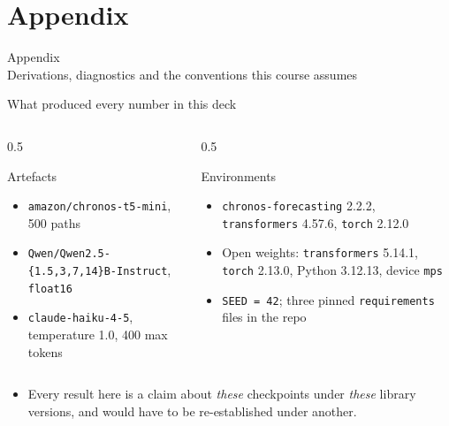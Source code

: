 \documentclass[9pt, aspectratio=169, t]{beamer}
\newcommand{\points}[1]{%
  \par\vspace{0.25em}%
  \begin{block}{}
    \vspace{-0.45em}
    {\small
     \setlength{\itemsep}{1pt}
     \begin{itemize}#1\end{itemize}}
    \vspace{-0.35em}
  \end{block}}
\begin{document}
\section{Appendix}
\begin{frame}[plain]
  \centering\vfill
  {\Large\textcolor{IDAred}{Appendix}}\\[0.4em]
  {\large Derivations, diagnostics and the conventions this course assumes}
  \vfill
\end{frame}

\begin{frame}{What produced every number in this deck}
  \begin{columns}[T]
    \begin{column}{0.5\textwidth}
      \begin{block}{Artefacts}
        \begin{itemize}
          \item \texttt{amazon/chronos-t5-mini}, 500 paths
          \item \texttt{Qwen/Qwen2.5-\{1.5,3,7,14\}B-Instruct}, \texttt{float16}
          \item \texttt{claude-haiku-4-5}, temperature 1.0, 400 max tokens
        \end{itemize}
      \end{block}
    \end{column}
    \begin{column}{0.5\textwidth}
      \begin{block}{Environments}
        \begin{itemize}
          \item \texttt{chronos-forecasting} 2.2.2, \texttt{transformers} 4.57.6,
                \texttt{torch} 2.12.0
          \item Open weights: \texttt{transformers} 5.14.1, \texttt{torch} 2.13.0,
                Python 3.12.13, device \texttt{mps}
          \item \texttt{SEED = 42}; three pinned \texttt{requirements} files in the repo
        \end{itemize}
      \end{block}
    \end{column}
  \end{columns}
  \points{%
      \item Every result here is a claim about \emph{these} checkpoints under \emph{these} library versions, and would have to be re-established under another.
  }
\end{frame}
\end{document}
